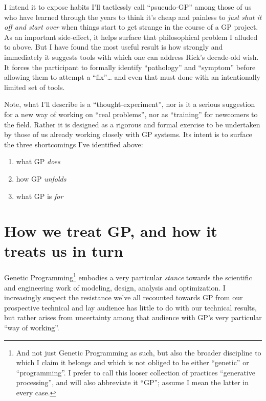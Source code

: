 I intend it to expose habits I'll tactlessly call ``psueudo-GP'' among those of us who have learned through the years to think it's cheap and painless to \emph{just shut it off and start over} when things start to get strange in the course of a GP project. As an important side-effect, it helps surface that philosophical problem I alluded to above. But I have found the most useful result is how strongly and immediately it suggests tools with which one can address Rick's decade-old wish. It forces the participant to formally identify ``pathology'' and ``symptom'' before allowing them to attempt a ``fix''\ldots{} and even that must done with an intentionally limited set of tools.

Note, what I'll describe is a ``thought-experiment'', nor is it a serious suggestion for a new way of working on ``real problems'', nor as ``training'' for newcomers to the field. Rather it is designed as a rigorous and formal exercise to be undertaken by those of us already working closely with GP systems. Its intent is to surface the three shortcomings I've identified above:

\begin{enumerate}
\item what GP \emph{does}
\item how GP \emph{unfolds}
\item what GP is \emph{for}
\end{enumerate}

\section{How we treat GP, and how it treats us in turn}\hypertarget{how-we-treat-gp-and-how-it-treats-us-in-turn}{}\label{how-we-treat-gp-and-how-it-treats-us-in-turn}

Genetic Programming\footnote{And not just Genetic Programming as such, but also the broader discipline to which I claim it belongs and which is not obliged to be either ``genetic'' or ``programming''. I prefer to call this looser collection of practices ``generative processing'', and will also abbreviate it ``GP''; assume I mean the latter in every case.} embodies a very particular \emph{stance} towards the scientific and engineering work of modeling, design, analysis and optimization. I increasingly suspect the resistance we've all recounted towards GP from our prospective technical and lay audience has little to do with our technical results, but rather arises from uncertainty among that audience with GP's very particular ``way of working''.


